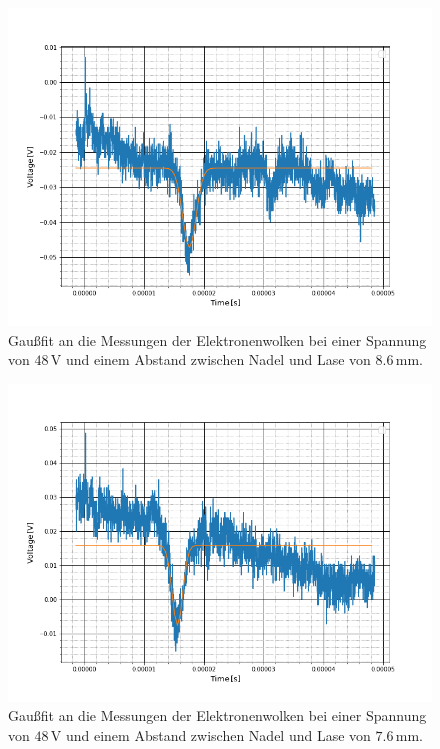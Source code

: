 \begin{figure}
	\includegraphics[scale=0.5]{Bild/S3}
	\centering
	\caption[Gaußfit an Messung bei Konst. Spannung 3]{Gaußfit an die Messungen der Elektronenwolken bei  einer Spannung von $48\,$V und einem Abstand zwischen Nadel und Lase von $8.6$\,mm.}
\end{figure}
\begin{figure}
	\includegraphics[scale=0.5]{Bild/S4}
	\centering
	\caption[Gaußfit an Messung bei Konst. Spannung 4]{Gaußfit an die Messungen der Elektronenwolken bei  einer Spannung von $48\,$V und einem Abstand zwischen Nadel und Lase von $7.6$\,mm.}
\end{figure}
